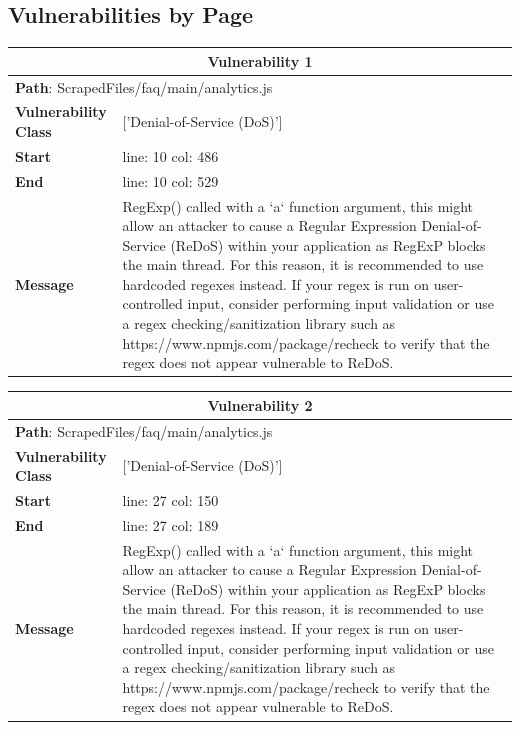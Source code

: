 \documentclass[12pt]{article}
\begin{document}
\subsection{Vulnerabilities by Page}
\begin{table}[!h]
\centering
\renewcommand{\arraystretch}{1.3}
\begin{tabular}{|l|p{10cm}|}
\hline
\multicolumn{2}{|c|}{\textbf{Vulnerability 1}} \\
\hline
\multicolumn{2}{|l|}{\textbf{Path}: ScrapedFiles/faq/main/analytics.js} \\
\hline
\textbf{Vulnerability Class} & ['Denial-of-Service (DoS)'] \\
\hline
\textbf{Start} & line: 10 \quad col: 486 \\
\hline
\textbf{End} & line: 10 \quad col: 529 \\
\hline
\textbf{Message} & RegExp() called with a `a` function argument, this might allow an attacker to cause a Regular Expression Denial-of-Service (ReDoS) within your application as RegExP blocks the main thread. For this reason, it is recommended to use hardcoded regexes instead. If your regex is run on user-controlled input, consider performing input validation or use a regex checking/sanitization library such as https://www.npmjs.com/package/recheck to verify that the regex does not appear vulnerable to ReDoS. \\
\hline
\end{tabular}
\end{table}
\vspace{0.7cm}
\FloatBarrier
\begin{table}[!h]
\centering
\renewcommand{\arraystretch}{1.3}
\begin{tabular}{|l|p{10cm}|}
\hline
\multicolumn{2}{|c|}{\textbf{Vulnerability 2}} \\
\hline
\multicolumn{2}{|l|}{\textbf{Path}: ScrapedFiles/faq/main/analytics.js} \\
\hline
\textbf{Vulnerability Class} & ['Denial-of-Service (DoS)'] \\
\hline
\textbf{Start} & line: 27 \quad col: 150 \\
\hline
\textbf{End} & line: 27 \quad col: 189 \\
\hline
\textbf{Message} & RegExp() called with a `a` function argument, this might allow an attacker to cause a Regular Expression Denial-of-Service (ReDoS) within your application as RegExP blocks the main thread. For this reason, it is recommended to use hardcoded regexes instead. If your regex is run on user-controlled input, consider performing input validation or use a regex checking/sanitization library such as https://www.npmjs.com/package/recheck to verify that the regex does not appear vulnerable to ReDoS. \\
\hline
\end{tabular}
\end{table}
\end{document}
